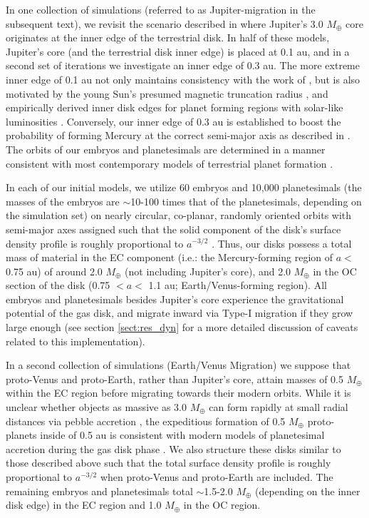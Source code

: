\documentclass[trackchanges,twocolumn]{aastex}
\begin{document}
In one collection of simulations (referred to as Jupiter-migration in the subsequent text), we revisit the scenario described in \citet{ray16} where Jupiter's 3.0 $M_{\oplus}$ core originates at the inner edge of the terrestrial disk.  In half of these models, Jupiter's core (and the terrestrial disk inner edge) is placed at 0.1 au, and in a second set of iterations we investigate an inner edge of 0.3 au.  The more extreme inner edge of 0.1 au not only maintains consistency with the work of \citet{ray16}, but is also motivated by the young Sun's presumed magnetic truncation radius \citep{frank92}, and empirically derived inner disk edges for planet forming regions with solar-like luminosities \citep{millan-gabet07}.  Conversely, our inner edge of 0.3 au is established to boost the probability of forming Mercury at the correct semi-major axis as described in \citet{clement21_merc2}.  The orbits of our embryos and planetesimals are determined in a manner consistent with most contemporary models of terrestrial planet formation \citep[e.g.:][]{chambers01,hansen09,clement18,ray18_rev}.  

In each of our initial models, we utilize 60 embryos and 10,000 planetesimals (the masses of the embryos are $\sim$10-100 times that of the planetesimals, depending on the simulation set) on nearly circular, co-planar, randomly oriented orbits with semi-major axes assigned such that the solid component of the disk's surface density profile is roughly proportional to $a^{-3/2}$ \citep[][Jupiter's core is considered in this calculation]{birnstiel12}.  Thus, our disks possess a total mass of material in the EC component (i.e.: the Mercury-forming region of $a<$ 0.75 au) of around 2.0 $M_{\oplus}$ (not including Jupiter's core), and 2.0 $M_{\oplus}$ in the OC section of the disk (0.75 $<a<$ 1.1 au; Earth/Venus-forming region).  All embryos and planetesimals besides Jupiter's core experience the gravitational potential of the gas disk, and migrate inward via Type-I migration if they grow large enough (see section \ref{sect:res_dyn} for a more detailed discussion of caveats related to this implementation).

In a second collection of simulations (Earth/Venus Migration) we suppose that proto-Venus and proto-Earth, rather than Jupiter's core, attain masses of 0.5 $M_{\oplus}$ within the EC region before migrating towards their modern orbits.  While it is unclear whether objects as massive as 3.0 $M_{\oplus}$ can form rapidly at small radial distances via pebble accretion \citep{boley14}, the expeditious formation of 0.5 $M_{\oplus}$ proto-planets inside of 0.5 au is consistent with modern models of planetesimal accretion during the gas disk phase \citep{morishma10,clement20_psj,woo21}.  We also structure these disks similar to those described above such that the total surface density profile is roughly proportional to $a^{-3/2}$ when proto-Venus and proto-Earth are included.  The remaining embryos and planetesimals total $\sim$1.5-2.0 $M_{\oplus}$ (depending on the inner disk edge) in the EC region and 1.0 $M_{\oplus}$ in the OC region.  
\end{document}
